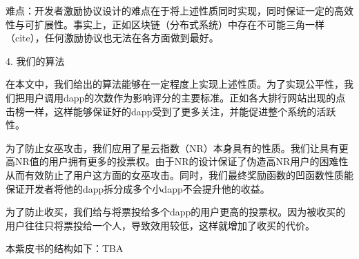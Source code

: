 难点：开发者激励协议设计的难点在于将上述性质同时实现，同时保证一定的高效性与可扩展性。事实上，正如区块链（分布式系统）中存在不可能三角一样（cite），任何激励协议也无法在各方面做到最好。

4. 我们的算法

在本文中，我们给出的算法能够在一定程度上实现上述性质。为了实现公平性，我们把用户调用dapp的次数作为影响评分的主要标准。正如各大排行网站出现的点击榜一样，这样能够保证好的dapp受到了更多关注，并能促进整个系统的活跃性。

为了防止女巫攻击，我们应用了星云指数（NR）本身具有的性质。我们让具有更高NR值的用户拥有更多的投票权。由于NR的设计保证了伪造高NR用户的困难性从而有效防止了用户这方面的女巫攻击。同时，我们最终奖励函数的凹函数性质能保证开发者将他的dapp拆分成多个小dapp不会提升他的收益。

为了防止收买，我们给与将票投给多个dapp的用户更高的投票权。因为被收买的用户往往只将票投给一个人，导致效用较低，这样就增加了收买的代价。

本紫皮书的结构如下：TBA
